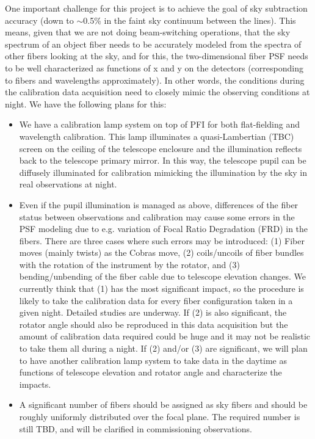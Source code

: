 \documentclass[a4paper]{article}
\begin{document}
One important challenge for this project is to achieve the goal of sky
subtraction accuracy (down to $\sim$0.5\% in the faint sky continuum
between the lines). This means, given that we are not doing
beam-switching operations, that the sky spectrum of an object fiber
needs to be accurately modeled from the spectra of other fibers
looking at the sky, and for this, the two-dimensional fiber PSF needs
to be well characterized as functions of x and y on the detectors
(corresponding to fibers and wavelengths approximately). In other
words, the conditions during the calibration data acquisition need to
closely mimic the observing conditions at night. We have the following
plans for this:

\begin{itemize}
\item We have a calibration lamp system on top of PFI for both
  flat-fielding and wavelength calibration. This lamp illuminates a
  quasi-Lambertian (TBC) screen on the ceiling of the telescope
  enclosure and the illumination reflects back to the telescope
  primary mirror. In this way, the telescope pupil can be diffusely
  illuminated for calibration mimicking the illumination by the sky in
  real observations at night.
\item Even if the pupil illumination is managed as above, differences
  of the fiber status between observations and calibration may cause
  some errors in the PSF modeling due to e.g. variation of Focal
  Ratio Degradation (FRD) in the fibers. There are three cases where
  such errors may be introduced: (1) Fiber moves (mainly twists) as
  the Cobras move, (2) coils/uncoils of fiber bundles with the
  rotation of the instrument by the rotator, and (3)
  bending/unbending of the fiber cable due to telescope elevation
  changes. We currently think that (1) has the most significant
  impact, so the procedure is likely to take the calibration data for
  every fiber configuration taken in a given night. Detailed studies
  are underway. If (2) is also significant, the rotator angle should
  also be reproduced in this data acquisition but the amount of
  calibration data required could be huge and it may not be realistic
  to take them all during a night. If (2) and/or (3) are significant,
  we will plan to have another calibration lamp system to take data
  in the daytime as functions of telescope elevation and rotator
  angle and characterize the impacts.
\item A significant number of fibers should be assigned as sky fibers
  and should be roughly uniformly distributed over the focal
  plane. The required number is still TBD, and will be clarified in
  commissioning observations.
\end{itemize}
\end{document}
